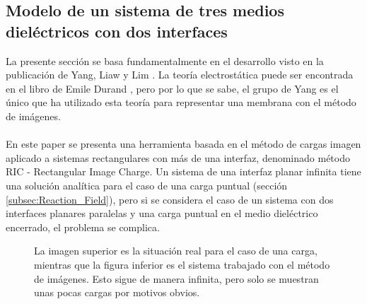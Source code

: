 \documentclass[12pt, oneside, numbers, spanish]{ezthesis}
\numberwithin{equation}{section}
\begin{document}
\subsection{Modelo de un sistema de tres medios dieléctricos con dos interfaces} \label{subsec:2_Inter_Images}
La presente sección se basa fundamentalmente en el desarrollo visto en la publicación de Yang, Liaw y Lim \cite{Pei-kun}. La teoría electrostática puede ser encontrada en el libro de Emile Durand \cite{Durand}, pero por lo que se sabe, el grupo de Yang es el único que ha utilizado esta teoría para representar una membrana con el método de imágenes.\\\\
En este paper se presenta una herramienta basada en el método de cargas imagen aplicado a sistemas rectangulares con más de una interfaz, denominado método RIC - Rectangular Image Charge. Un sistema de una interfaz planar infinita tiene una solución analítica para el caso de una carga puntual (sección \ref{subsec:Reaction_Field}), pero si se considera el caso de un sistema con dos interfaces planares paralelas y una carga puntual en el medio dieléctrico encerrado, el problema se complica.
\begin{figure}[h]
\centering

\caption{La imagen superior es la situación real para el caso de una carga, mientras que la figura inferior es el sistema trabajado con el método de imágenes. Esto sigue de manera infinita, pero solo se muestran unas pocas cargas por motivos obvios.}
\label{Fig:Infty_Images}
\end{figure}
\end{document}
